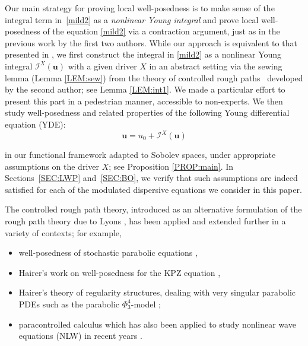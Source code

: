 \documentclass[letterpaper, 11pt,  reqno]{amsart}
\newcommand{\1}{\hspace{0.5mm}\text{I}\hspace{0.5mm}}
\newcommand{\I}{\mathcal{I}}
\newcommand{\noi}{\noindent}
\newcommand{\uu}{\mathbf{u}}
\numberwithin{equation}{section}
\numberwithin{theorem}{section}
\begin{document}
 

Our main strategy for proving local well-posedness is to make sense of the integral term in~\eqref{mild2}
as a {\it nonlinear Young integral}
and prove local well-posedness of  the equation \eqref{mild2}
via a contraction argument, 
just as in the previous work \cite{CG1}
by the first two authors.
While our approach is equivalent
to that presented in \cite{CG1}, 
we first construct the integral in \eqref{mild2}
as a nonlinear Young integral
$\I^X(\uu)$ with a given driver $X$
in an abstract setting
via the sewing lemma
(Lemma \ref{LEM:sew})
from 
the theory of controlled rough paths~\cite{Gub04}
developed by the second author; see Lemma \ref{LEM:int1}.
We made a particular effort to 
present this part 
in a pedestrian manner, accessible
to non-experts.
We then study well-posedness and related properties of the following
Young differential equation (YDE):
\begin{equation}
\uu = u_0 + \I^X(\uu)
\label{YDE0}
\end{equation}

\noi
in our functional framework adapted to Sobolev spaces, 
under appropriate assumptions 
on the driver $X$; 
see Proposition \ref{PROP:main}.
In Sections~\ref{SEC:LWP} and~\ref{SEC:BO}, 
we verify 
that such assumptions are indeed satisfied
for each of the modulated dispersive equations
we consider in this paper.









The controlled rough path theory, 
introduced 
as an alternative formulation of the rough path theory
due to Lyons
\cite{Lyons1, Lyons2}, 
has been applied and extended further in a variety of contexts; 
for example, 

\smallskip
\begin{itemize}
\item
well-posedness of stochastic parabolic  equations \cite{GT10, DGT12}, 

\smallskip
\item
Hairer's work on well-posedness for the KPZ equation \cite{Hairer1}, 


\smallskip
\item
Hairer's theory of regularity structures, 
 dealing with very singular parabolic PDEs such as the parabolic  
 $\Phi_3^4$-model \cite{Hairer2}; 


\smallskip
\item
paracontrolled calculus \cite{GIP, CK, MW}
which has also been applied 
to study  nonlinear wave equations (NLW)
in recent years
\cite{GKO2, OOT1, Bring, OOT2, BDNY}.

\end{itemize}
\end{document}
